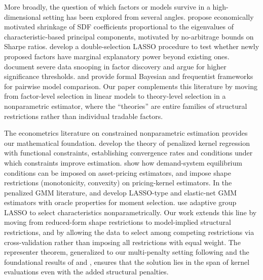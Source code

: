 More broadly, the question of which factors or models survive in a high-dimensional setting has been explored from several angles. \citet{Kozak2020shrinking} propose economically motivated shrinkage of SDF coefficients proportional to the eigenvalues of characteristic-based principal components, motivated by no-arbitrage bounds on Sharpe ratios. \citet{Feng2020taming} develop a double-selection LASSO procedure to test whether newly proposed factors have marginal explanatory power beyond existing ones. \citet{Harvey2016cross} document severe data snooping in factor discovery and argue for higher significance thresholds. \citet{Barillas2018comparing} and \citet{Kan2013pricing} provide formal Bayesian and frequentist frameworks for pairwise model comparison. Our paper complements this literature by moving from factor-level selection in linear models to theory-level selection in a nonparametric estimator, where the ``theories'' are entire families of structural restrictions rather than individual tradable factors.

The econometrics literature on constrained nonparametric estimation provides our mathematical foundation. \citet{babii2024structural} develop the theory of penalized kernel regression with functional constraints, establishing convergence rates and conditions under which constraints improve estimation. \citet{gabaix2024asset} show how demand-system equilibrium conditions can be imposed on asset-pricing estimators, and \citet{bryzgalova2023asset} impose shape restrictions (monotonicity, convexity) on pricing-kernel estimators. In the penalized GMM literature, \citet{Caner2009lasso} and \citet{Caner2014adaptive} develop LASSO-type and elastic-net GMM estimators with oracle properties for moment selection. \citet{Freyberger2020dissecting} use adaptive group LASSO to select characteristics nonparametrically. Our work extends this line by moving from reduced-form shape restrictions to model-implied structural restrictions, and by allowing the data to select among competing restrictions via cross-validation rather than imposing all restrictions with equal weight. The representer theorem, generalized to our multi-penalty setting following \citet{Scholkopf2002learning} and the foundational results of \citet{Kimeldorf1971correspondence} and \citet{Wahba1990spline}, ensures that the solution lies in the span of kernel evaluations even with the added structural penalties.

